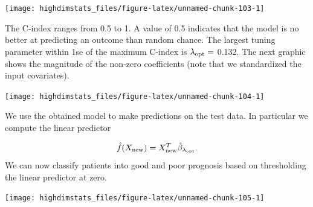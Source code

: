 \documentclass[
]{book}
\newenvironment{Shaded}{\begin{snugshade}}{\end{snugshade}}
\newcommand{\AttributeTok}[1]{\textcolor[rgb]{0.77,0.63,0.00}{#1}}
\newcommand{\CommentTok}[1]{\textcolor[rgb]{0.56,0.35,0.01}{\textit{#1}}}
\newcommand{\ConstantTok}[1]{\textcolor[rgb]{0.00,0.00,0.00}{#1}}
\newcommand{\DecValTok}[1]{\textcolor[rgb]{0.00,0.00,0.81}{#1}}
\newcommand{\FloatTok}[1]{\textcolor[rgb]{0.00,0.00,0.81}{#1}}
\newcommand{\FunctionTok}[1]{\textcolor[rgb]{0.00,0.00,0.00}{#1}}
\newcommand{\NormalTok}[1]{#1}
\newcommand{\OtherTok}[1]{\textcolor[rgb]{0.56,0.35,0.01}{#1}}
\newcommand{\SpecialCharTok}[1]{\textcolor[rgb]{0.00,0.00,0.00}{#1}}
\newcommand{\StringTok}[1]{\textcolor[rgb]{0.31,0.60,0.02}{#1}}
\begin{document}
\begin{center}\texttt{[image: highdimstats\_files/figure-latex/unnamed-chunk-103-1]} \end{center}

The C-index ranges from 0.5 to 1. A value of 0.5 indicates that the model is no better at predicting an outcome than random chance. The largest tuning parameter within 1se of the maximum C-index is \(\lambda_{\rm{opt}}=\) 0.132. The next graphic shows the magnitude of the non-zero coefficients (note that we standardized the input covariates).

\begin{center}\texttt{[image: highdimstats\_files/figure-latex/unnamed-chunk-104-1]} \end{center}

We use the obtained model to make predictions on the test data. In particular we compute the linear predictor

\[\hat{f}(X_{\textrm{new}})=X_{\textrm{new}}^T\hat{\beta}_{\lambda_{\rm opt}}.\]
We can now classify patients into good and poor prognosis based on thresholding the linear predictor at zero.

\begin{Shaded}
\end{Shaded}

\begin{center}\texttt{[image: highdimstats\_files/figure-latex/unnamed-chunk-105-1]} \end{center}
\end{document}
